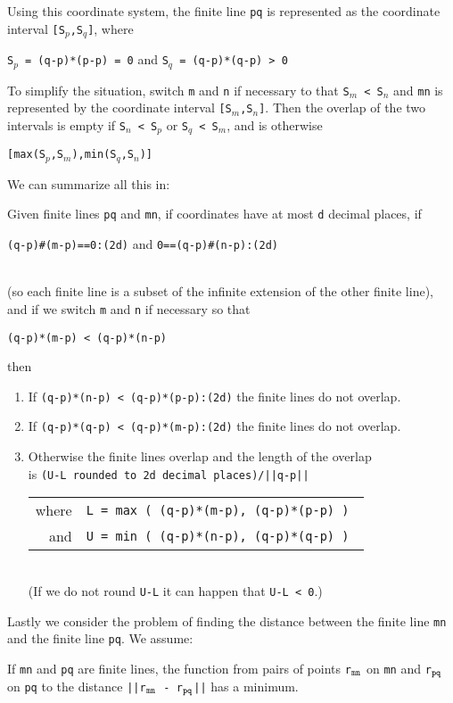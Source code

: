 \documentclass[12pt]{article}
\begin{document}
Using this coordinate system, the finite line {\tt pq} is represented
as the coordinate interval {\tt [S$_p$,S$_q$]}, where \\
\centerline{{\tt S$_p$ = (q-p)*(p-p) = 0} and {\tt S$_q$ = (q-p)*(q-p) > 0 }}
To simplify
the situation, switch {\tt m} and {\tt n} if necessary to that
{\tt S$_m$ < S$_n$} and {\tt mn} is represented by the coordinate
interval {\tt [S$_m$,S$_n$]}.  Then the overlap of the two intervals
is empty if {\tt S$_n$ < S$_p$} or {\tt S$_q$ < S$_m$}, and is
otherwise \\
\centerline{\tt [max(S$_p$,S$_m$),min(S$_q$,S$_n$)]}

We can summarize all this in:
\begin{lemma}
Given finite lines {\tt pq} and {\tt mn},
if coordinates have at most {\tt d} decimal places, if
\\[1ex]
\centerline{{\tt (q-p)\#(m-p)==0:(2d)} and {\tt 0==(q-p)\#(n-p):(2d)}}
\\[1ex]
(so each finite line is a subset of the infinite extension of the
other finite line),
and if we switch {\tt m} and {\tt n} if necessary so that \\
\centerline{\tt (q-p)*(m-p) < (q-p)*(n-p)}
then
\begin{enumerate}
\item If {\tt (q-p)*(n-p) < (q-p)*(p-p):(2d)} the finite lines do not overlap.
\item If {\tt (q-p)*(q-p) < (q-p)*(m-p):(2d)} the finite lines do not overlap.
\item Otherwise the finite lines overlap and the length of the overlap \\
is {\tt (U-L {\rm rounded to} {\tt 2d} {\rm decimal places})/||q-p||} \\
\hspace*{0.5in}\begin{tabular}{rl}
where	& \tt L = max ( (q-p)*(m-p), (q-p)*(p-p) ) \\
and	& \tt U = min ( (q-p)*(n-p), (q-p)*(q-p) ) \\
\end{tabular} \\
(If we do not round {\tt U-L} it can happen that {\tt U-L < 0}.)
\end{enumerate}
\end{lemma}


Lastly we consider the problem of finding the distance between
the finite line {\tt mn} and the finite line {\tt pq}.  We assume:

\begin{theorem}
If {\tt mn} and {\tt pq} are finite lines, the function from pairs
of points
{\tt r$_{\tt mn}$} on {\tt mn} and
{\tt r$_{\tt pq}$} on {\tt pq}  to the distance
{\tt ||r$_{\tt mn}$ - r$_{\tt pq}$||} has a minimum.
\end{theorem}
\end{document}
